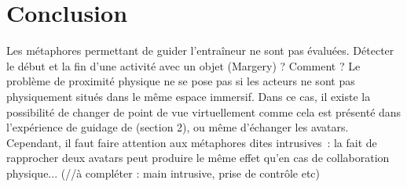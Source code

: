 \documentclass[11pt]{article}
\begin{document}
\begin{comment}
For the first type of actions, The same metaphors than for the collaboration tasks can be used. For the second type, four metaphors can be evaluated:
\begin{enumerate}
	\item The coach avatar casts a spell using a specific gesture and voice control. Such a multimodal command can be real, i.e the coach has to perform it in order to make a parameter change, or just a metaphor, i.e the coach doesn't perform it but his avatar moves and speaks automatically.
	\item A 3D animation is performed by the system. For example, a grey cloud can appear and move through the scene in order to indicate that the weather is now rainy.
	\item A popup indicating the change is displayed.
	\item No indication at all.
\end{enumerate}

Several perception aspects can be evaluated thanks to these tests: the annoyance and pleasant degrees and the execution time (some metaphors can capture the attention of the trainee for a quite long time).
\end{comment}

\section{Conclusion}

Les métaphores permettant de guider l'entraîneur ne sont pas évaluées.
Détecter le début et la fin d'une activité avec un objet (Margery) ? Comment ?
Le problème de proximité physique ne se pose pas si les acteurs ne sont pas physiquement situés dans le même espace immersif. Dans ce cas, il existe la possibilité de changer de point de vue virtuellement comme cela est présenté dans l'expérience de guidage de \cite{thesis} (section 2), ou même d'échanger les avatars. Cependant, il faut faire attention aux métaphores dites intrusives~: la fait de rapprocher deux avatars peut produire le même effet qu'en cas de collaboration physique... (//à compléter : main intrusive, prise de contrôle etc)
\end{document}
